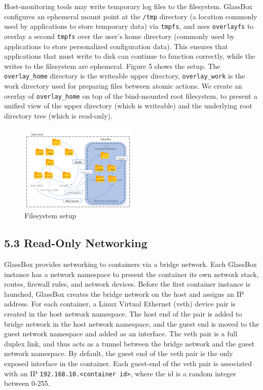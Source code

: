 \documentclass{proc}
\begin{document}
Host-monitoring tools may write temporary log files to the filesystem. GlassBox configures an ephemeral mount point at the \texttt{/tmp} directory (a location commonly used by applications to store temporary data) via \texttt{tmpfs}, and uses \texttt{overlayfs} to overlay a second \texttt{tmpfs} over the user's home directory (commonly used by applications to store personalized configuration data). This ensures that applications that must write to disk can continue to function correctly, while the writes to the filesystem are ephemeral. Figure 5 shows the setup. The \texttt{overlay\_home} directory is the writeable upper directory, \texttt{overlay\_work} is the work directory used for preparing files between atomic actions. We create an overlay of \texttt{overlay\_home} on top of the bind-mounted root filesystem, to present a unified view of the upper directory (which is writeable) and the underlying root directory tree (which is read-only).


\begin{figure}
\includegraphics[width=0.5\textwidth]{fs_diagram}
\caption{Filesystem setup}
\end{figure}

\subsection*{5.3 Read-Only Networking}

GlassBox provides networking to containers via a bridge network. Each GlassBox instance has a network namespace to present the container its own network stack, routes, firewall rules, and network devices. Before the first container instance is launched, GlassBox creates the bridge network on the host and assigns an IP address. For each container, a Linux Virtual Ethernet (veth) device pair is created in the host network namespace. The host end of the pair is added to bridge network in the host network namespace, and the guest end is moved to the guest network namespace and added as an interface. The veth pair is a full duplex link, and thus acts as a tunnel between the bridge network and the guest network namespace. By default, the guest end of the veth pair is the only exposed interface in the container. Each guest-end of the veth pair is associated with an IP \texttt{192.168.10.<container id>}, where the id is a random integer between 0-255.
\end{document}
